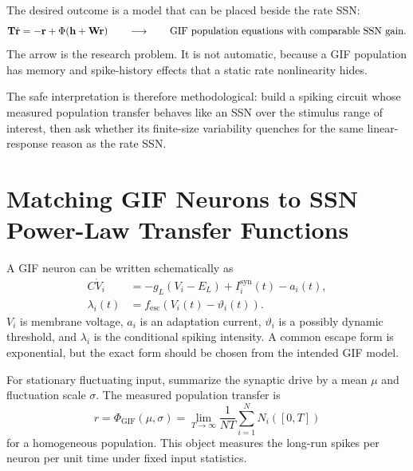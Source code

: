 The desired outcome is a model that can be placed beside the rate SSN:
%
\begin{equation}
  \mathbf{T}\dot{\mathbf{r}}
  =
  -\mathbf{r}+\Phi(\mathbf{h}+\mathbf{W}\mathbf{r})
  \qquad
  \longrightarrow
  \qquad
  \text{GIF population equations with comparable SSN gain.}
  \label{eq:rate-ssn-to-gif-ssn}
\end{equation}
%
The arrow is the research problem. It is not automatic, because a GIF population has memory and spike-history effects that a static rate nonlinearity hides.

The safe interpretation is therefore methodological: build a spiking circuit whose measured population transfer behaves like an SSN over the stimulus range of interest, then ask whether its finite-size variability quenches for the same linear-response reason as the rate SSN.

\section{Matching GIF Neurons to SSN Power-Law Transfer Functions}
\label{sec:matching-gif-to-ssn-power-laws}

A GIF neuron can be written schematically as
%
\begin{align}
  C\dot V_i
  &=
  -g_L(V_i-E_L)
  +
  I_i^{\mathrm{syn}}(t)
  -
  a_i(t),
  \label{eq:gif-voltage-ch16}\\
  \lambda_i(t)
  &=
  f_{\mathrm{esc}}\!\left(V_i(t)-\vartheta_i(t)\right).
  \label{eq:gif-hazard-ch16}
\end{align}
%
$V_i$ is membrane voltage, $a_i$ is an adaptation current, $\vartheta_i$ is a possibly dynamic threshold, and $\lambda_i$ is the conditional spiking intensity. A common escape form is exponential, but the exact form should be chosen from the intended GIF model.

For stationary fluctuating input, summarize the synaptic drive by a mean $\mu$ and fluctuation scale $\sigma$. The measured population transfer is
%
\begin{equation}
  r
  =
  \Phi_{\mathrm{GIF}}(\mu,\sigma)
  =
  \lim_{T\to\infty}
  \frac{1}{NT}
  \sum_{i=1}^{N}N_i([0,T])
  \label{eq:gif-measured-transfer}
\end{equation}
%
for a homogeneous population. This object measures the long-run spikes per neuron per unit time under fixed input statistics.

